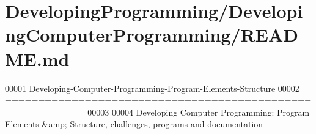 \hypertarget{_r_e_a_d_m_e_8md_source}{\section{Developing\+Programming/\+Developing\+Computer\+Programming/\+R\+E\+A\+D\+M\+E.md}
}

\begin{DoxyCode}
00001 Developing-Computer-Programming-Program-Elements-Structure
00002 ==========================================================
00003 
00004 Developing Computer Programming: Program Elements &amp; Structure, challenges, programs and
       documentation
\end{DoxyCode}
